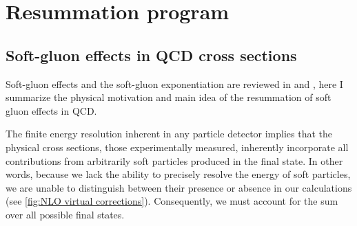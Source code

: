 \documentclass[../main.tex]{subfiles}
\begin{document}
\chapter{Resummation program}\label{ch:resummation}

\section{Soft-gluon effects in QCD cross sections} \label{sec:Soft_gluon_effects}

Soft-gluon effects and the soft-gluon exponentiation are reviewed in \cite{Catani_1997} and \cite{catani1997softgluon}, here I summarize the physical 
motivation and main idea of the resummation of soft gluon effects in QCD.

The finite energy resolution inherent in any particle detector implies that the physical cross sections, 
those experimentally measured, inherently incorporate all contributions from arbitrarily soft particles 
produced in the final state. In other words, because we lack the ability to precisely resolve the energy 
of soft particles, we are unable to distinguish between their presence or absence in our calculations (see \cref{fig:NLO virtual corrections}). 
Consequently, we must account for the sum over all possible final states.
\end{document}
